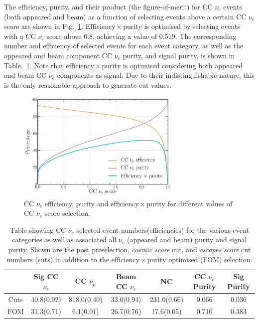 The efficiency, purity, and their product (the figure-of-merit) for CC $\nu_{e}$ events (both
appeared and beam) as a function of selecting events above a certain CC $\nu_{e}$ score are shown
in Fig.~\ref{fig:final_nuel_eff_curves}. $\mathrm{Efficiency}\times\mathrm{purity}$ is optimised
by selecting events with a CC $\nu_{e}$ score above $0.8$, achieving a value of $0.519$. The
corresponding number and efficiency of selected events for each event category, as well as the
appeared and beam component CC $\nu_{e}$ purity, and signal purity, is shown in
Table.~\ref{tab:nuel_selection}. Note that $\mathrm{efficiency}\times\mathrm{purity}$ is optimised
considering both appeared and beam CC $\nu_{e}$ components as signal. Due to their
indistinguishable nature, this is the only reasonable approach to generate cut values.

\begin{figure} %
    \includegraphics[width=0.7\textwidth]{diagrams/6-cvn/chipsnet/final_nuel_eff_curves.pdf}
    \caption[CC $\nu_{e}$ efficiency, purity and $\mathrm{efficiency}\times\mathrm{purity}$.]
    {CC $\nu_{e}$ efficiency, purity and $\mathrm{efficiency}\times\mathrm{purity}$ for different
        values of CC $\nu_{e}$ score selection.}
    \label{fig:final_nuel_eff_curves}
\end{figure}

\begin{table}
    \begin{tabular}{ccccccc}
             & Sig CC $\nu_{e}$ & CC $\nu_{\mu}$ & Beam CC $\nu_{e}$ & NC          & CC $\nu_{e}$ Purity & Sig Purity \\
        \midrule
        Cuts & 40.8(0.92)       & 818.0(0.40)    & 33.0(0.94)        & 231.0(0.66) & 0.066               & 0.036      \\
        FOM  & 31.3(0.71)       & 6.1(0.01)      & 26.7(0.76)        & 17.6(0.05)  & 0.710               & 0.383      \\
    \end{tabular}
    \caption[Table showing CC $\nu_{e}$ selected event numbers, efficiencies and signal purity.]
    {Table showing CC $\nu_{e}$ selected event numbers(efficiencies) for the various event
        categories as well as associated all $\nu_{e}$ (appeared and beam) purity and signal
        purity. Shown are the post preselection, \emph{cosmic score} cut, and \emph{escapes score}
        cut numbers (cuts) in addition to the $\mathrm{efficiency}\times\mathrm{purity}$ optimised
        (FOM) selection.}
    \label{tab:nuel_selection}
\end{table}


